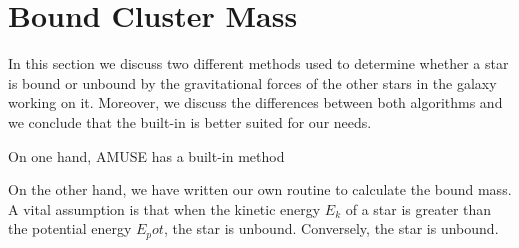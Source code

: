 \documentclass{aa}
\begin{document}
\section{Bound Cluster Mass}
  In this section we discuss two different methods used to determine whether
  a star is bound or unbound by the gravitational forces of the other stars in the 
  galaxy working on it. Moreover, we discuss the differences between both
  algorithms and we conclude that the built-in is better suited for our needs.
  
  On one hand, AMUSE has a built-in method \citep{1998ApJ...498..137E}
  
  On the other hand, we have written our own routine to calculate the bound mass.
  A vital assumption is that when the kinetic energy $E_k$ of a star is greater than the potential
  energy $E_pot$, the star is unbound. Conversely, the star is unbound.


\end{document}
